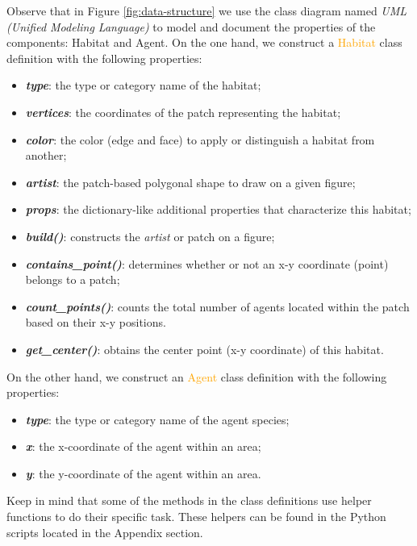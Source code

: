 \noindent
Observe that in Figure \ref{fig:data-structure} we use the class diagram named \emph{UML (Unified Modeling Language)} to model and document the properties of the components: Habitat and Agent. On the one hand, we construct a \textcolor{orange}{Habitat} class definition with the following properties:
\begin{itemize}
    \item \textbf{\textit{type}}: the type or category name of the habitat;
    \item \textbf{\textit{vertices}}: the coordinates of the patch representing the habitat;
    \item \textbf{\textit{color}}: the color (edge and face) to apply or distinguish a habitat from another;
    \item \textbf{\textit{artist}}: the patch-based polygonal shape to draw on a given figure;
    \item \textbf{\textit{props}}: the dictionary-like additional properties that characterize this habitat;
    \item \textbf{\textit{build()}}: constructs the \emph{artist} or patch on a figure;
    \item \textbf{\textit{contains\_point()}}: determines whether or not an x-y coordinate (point) belongs to a patch;
    \item \textbf{\textit{count\_points()}}: counts the total number of agents located within the patch based on their x-y positions.
    \item \textbf{\textit{get\_center()}}: obtains the center point (x-y coordinate)  of this habitat.
\end{itemize}

\noindent
On the other hand,  we construct an \textcolor{orange}{Agent} class definition with the following properties:
\begin{itemize}
    \item \textbf{\textit{type}}: the type or category name of the agent species;
    \item \textbf{\textit{x}}: the x-coordinate of the agent within an area;
    \item \textbf{\textit{y}}: the y-coordinate of the agent within an area.
\end{itemize}

\noindent
Keep in mind that some of the methods in the class definitions use helper functions to do their specific task. These helpers can be found in the Python scripts located in the Appendix section.

